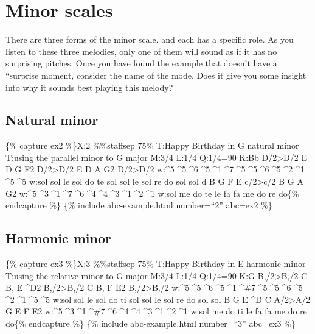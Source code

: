 \documentclass{book}
\begin{document}
\hypertarget{minor-scales}{%
\section{Minor scales}\label{minor-scales}}

There are three forms of the minor scale, and each has a specific role. As you
listen to these three melodies, only one of them will sound as if it has no
surprising pitches. Once you have found the example that doesn't have a
``surprise moment, consider the name of the mode. Does it give you some
insight into why it sounds best playing this melody?

\hypertarget{natural-minor}{%
\subsection{Natural minor}\label{natural-minor}}

\{\% capture ex2 \%\}X:2 \%\%staffsep 75\% T:Happy Birthday in G natural minor
T:using the parallel minor to G major M:3/4 L:1/4 Q:1/4=90 K:Bb
D/2\textgreater D/2\textbar{} E D G\textbar{} F2 D/2\textgreater D/2\textbar{}
E D A\textbar{} G2 D/2\textgreater D/2\textbar{} w:\^{}5 \^{}5 \^{}6 \^{}5
\^{}1 \^{}7 \^{}5 \^{}5 \^{}6 \^{}5 \^{}2 \^{}1 \^{}5 \^{}5 w:sol sol le sol
do te sol sol le sol re do sol sol d B G\textbar{} F E
c/2\textgreater c/2\textbar{} B G A\textbar{} G2\textbar{]} w:\^{}5 \^{}3
\^{}1 \^{}7 \^{}6 \^{}4 \^{}4 \^{}3 \^{}1 \^{}2 \^{}1 w:sol me do te le fa fa
me do re do\{\% endcapture \%\} \{\% include abc-example.html number=``2''
abc=ex2 \%\}

\hypertarget{harmonic-minor}{%
\subsection{Harmonic minor}\label{harmonic-minor}}

\{\% capture ex3 \%\}X:3 \%\%staffsep 75\% T:Happy Birthday in E harmonic
minor T:using the relative minor to G major M:3/4 L:1/4 Q:1/4=90 K:G
B,/2\textgreater B,/2\textbar{} C B, E\textbar{} \^{}D2
B,/2\textgreater B,/2\textbar{} C B, F\textbar{} E2
B,/2\textgreater B,/2\textbar{} w:\^{}5 \^{}5 \^{}6 \^{}5 \^{}1 \^{}\#7 \^{}5
\^{}5 \^{}6 \^{}5 \^{}2 \^{}1 \^{}5 \^{}5 w:sol sol le sol do ti sol sol le
sol re do sol sol B G E\textbar{} \^{}D C A/2\textgreater A/2\textbar{} G E
F\textbar{} E2\textbar{]} w:\^{}5 \^{}3 \^{}1 \^{}\#7 \^{}6 \^{}4 \^{}4 \^{}3
\^{}1 \^{}2 \^{}1 w:sol me do ti le fa fa me do re do\{\% endcapture \%\} \{\%
include abc-example.html number=``3'' abc=ex3 \%\}
\end{document}

